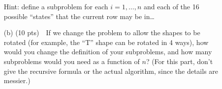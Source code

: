 \documentclass[11pt]{article}
\begin{document}
\begin{description}
\begin{enumerate}
Hint: define a subproblem for each $i=1,\ldots,n$ and each of the 16 possible ``states'' that
the current row may be in\ldots

\item[(b)] (10 pts)\ \
If we change the problem to allow the shapes to be rotated (for example, the ``T'' shape can be rotated in 4 ways),
how would you change the definition of your subproblems, and how many subproblems
would you need as a function of $n$?
(For this part, don't give the recursive formula or the actual algorithm, since the details are messier.)

\end{enumerate}

\end{description}
\end{document}
